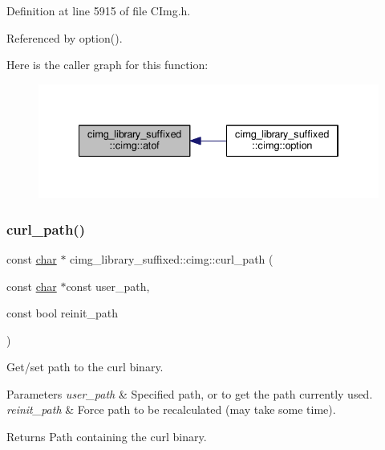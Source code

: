 Definition at line 5915 of file C\+Img.\+h.



Referenced by option().

Here is the caller graph for this function\+:
\nopagebreak
\begin{figure}[H]
\begin{center}
\leavevmode
\includegraphics[width=334pt]{d4/d9b/namespacecimg__library__suffixed_1_1cimg_a00aba235049bc02e53453cbb829469ce_icgraph}
\end{center}
\end{figure}
\mbox{\label{namespacecimg__library__suffixed_1_1cimg_aebd4f990c3e148573c96c04dbfdcc5c6}} 
\subsubsection{\texorpdfstring{curl\+\_\+path()}{curl\_path()}}
{\footnotesize\ttfamily const \hyperlink{classchar}{char} $\ast$ cimg\+\_\+library\+\_\+suffixed\+::cimg\+::curl\+\_\+path (\begin{DoxyParamCaption}\item[{const \hyperlink{classchar}{char} $\ast$const}]{user\+\_\+path,  }\item[{const bool}]{reinit\+\_\+path }\end{DoxyParamCaption})\hspace{0.3cm}{\ttfamily [inline]}}



Get/set path to the {\ttfamily curl} binary. 


\begin{DoxyParams}{Parameters}
{\em user\+\_\+path} & Specified path, or {} to get the path currently used. \\
\hline
{\em reinit\+\_\+path} & Force path to be recalculated (may take some time). \\
\hline
\end{DoxyParams}
\begin{DoxyReturn}{Returns}
Path containing the {\ttfamily curl} binary. 
\end{DoxyReturn}


